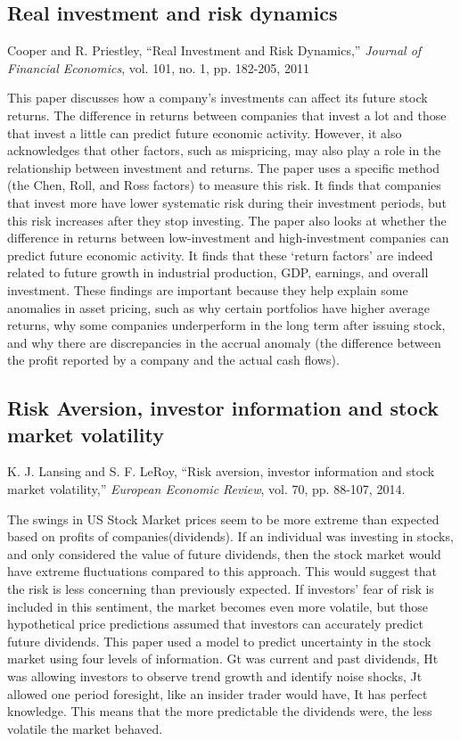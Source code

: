 \documentclass[12pt]{article}
\begin{document}
\subsection{Real investment and risk dynamics}
Cooper and R. Priestley, “Real Investment and Risk Dynamics,” \textit{Journal of Financial Economics}, vol. 101, no. 1, pp. 182-205, 2011
\newline

This paper discusses how a company’s investments can affect its future stock returns. The difference in returns between companies that invest a lot and those that invest a little can predict future economic activity. However, it also acknowledges that other factors, such as mispricing, may also play a role in the relationship between investment and returns. 
The paper uses a specific method (the Chen, Roll, and Ross factors) to measure this risk. It finds that companies that invest more have lower systematic risk during their investment periods, but this risk increases after they stop investing.
The paper also looks at whether the difference in returns between low-investment and high-investment companies can predict future economic activity. It finds that these ‘return factors’ are indeed related to future growth in industrial production, GDP, earnings, and overall investment.
These findings are important because they help explain some anomalies in asset pricing, such as why certain portfolios have higher average returns, why some companies underperform in the long term after issuing stock, and why there are discrepancies in the accrual anomaly (the difference between the profit reported by a company and the actual cash flows).

\subsection{Risk Aversion, investor information and stock market volatility}
K. J. Lansing and S. F. LeRoy, “Risk aversion, investor information and stock market volatility,” \textit{European Economic Review}, vol. 70, pp. 88-107, 2014. 
\newline

The swings in US Stock Market prices seem to be more extreme than expected based on profits of companies(dividends). If an individual was investing in stocks, and only considered the value of future dividends, then the stock market would have extreme fluctuations compared to this approach. This would suggest that the risk is less concerning than previously expected. If investors’ fear of risk is included in this sentiment, the market becomes even more volatile, but those hypothetical price predictions assumed that investors can accurately predict future dividends. This paper used a model to predict uncertainty in the stock market using four levels of information. Gt was current and past dividends, Ht was allowing investors to observe trend growth and identify noise shocks, Jt allowed one period foresight, like an insider trader would have, It has perfect knowledge. This means that the more predictable the dividends were, the less volatile the market behaved. 
\end{document}
